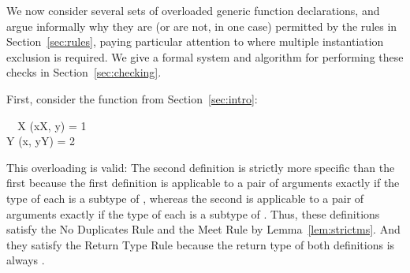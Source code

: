 \documentclass[10pt]{sigplanconf}
\newcommand{\TODO}[1]{\textbf{\emph{\textcolor{red}{TODO}}}: \textsf{\footnotesize #1}}
\begin{document}










We now consider several sets of overloaded generic function declarations, 
and argue informally why they are 
(or are not, in one case) 
permitted by the rules in Section~\ref{sec:rules}, 
paying particular attention to where multiple instantiation exclusion is required.
We give a formal system and algorithm for performing these checks 
in Section~\ref{sec:checking}.

First, consider the function 
from Section~\ref{sec:intro}:

\small
\begin{FortressCode}
{\tt ~~}\+\llbracket{}X \SHORTCUT{<} \rrbracket(x\COLON X, y\COLON {})\COLON {} = 1 \\
  \llbracket{}Y \SHORTCUT{<} \rrbracket(x\COLON {}, y\COLON Y)\COLON {} = 2\-
\end{FortressCode}
\normalsize
This overloading is valid: 
The second definition is strictly more specific than the first 
because the first definition is applicable to a pair of arguments 
exactly if the type of each is a subtype of , 
whereas the second is applicable to a pair of arguments exactly if
the type of each is a subtype of .
Thus, these definitions satisfy the No Duplicates Rule 
and the Meet Rule by Lemma~\ref{lem:strictms}.
And they satisfy the Return Type Rule 
because the return type of both definitions is always .
\end{document}
